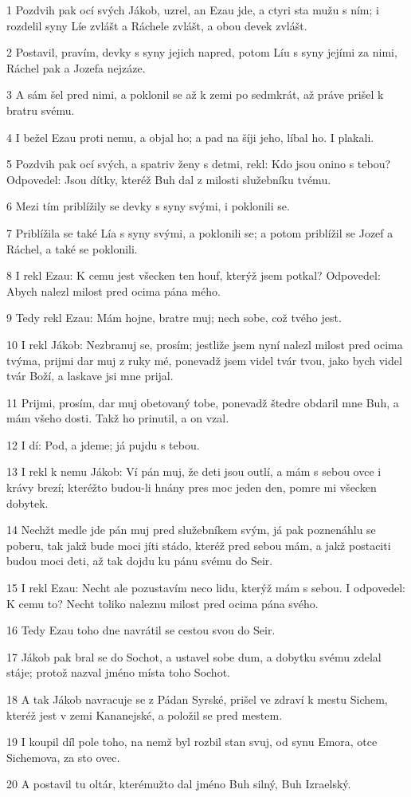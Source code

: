 \par 1 Pozdvih pak ocí svých Jákob, uzrel, an Ezau jde, a ctyri sta mužu s ním; i rozdelil syny Líe zvlášt a Ráchele zvlášt, a obou devek zvlášt.
\par 2 Postavil, pravím, devky s syny jejich napred, potom Líu s syny jejími za nimi, Ráchel pak a Jozefa nejzáze.
\par 3 A sám šel pred nimi, a poklonil se až k zemi po sedmkrát, až práve prišel k bratru svému.
\par 4 I bežel Ezau proti nemu, a objal ho; a pad na šíji jeho, líbal ho. I plakali.
\par 5 Pozdvih pak ocí svých, a spatriv ženy s detmi, rekl: Kdo jsou onino s tebou? Odpovedel: Jsou dítky, kteréž Buh dal z milosti služebníku tvému.
\par 6 Mezi tím priblížily se devky s syny svými, i poklonili se.
\par 7 Priblížila se také Lía s syny svými, a poklonili se; a potom priblížil se Jozef a Ráchel, a také se poklonili.
\par 8 I rekl Ezau: K cemu jest všecken ten houf, kterýž jsem potkal? Odpovedel: Abych nalezl milost pred ocima pána mého.
\par 9 Tedy rekl Ezau: Mám hojne, bratre muj; nech sobe, což tvého jest.
\par 10 I rekl Jákob: Nezbranuj se, prosím; jestliže jsem nyní nalezl milost pred ocima tvýma, prijmi dar muj z ruky mé, ponevadž jsem videl tvár tvou, jako bych videl tvár Boží, a laskave jsi mne prijal.
\par 11 Prijmi, prosím, dar muj obetovaný tobe, ponevadž štedre obdaril mne Buh, a mám všeho dosti. Takž ho prinutil, a on vzal.
\par 12 I dí: Pod, a jdeme; já pujdu s tebou.
\par 13 I rekl k nemu Jákob: Ví pán muj, že deti jsou outlí, a mám s sebou ovce i krávy brezí; kteréžto budou-li hnány pres moc jeden den, pomre mi všecken dobytek.
\par 14 Nechžt medle jde pán muj pred služebníkem svým, já pak poznenáhlu se poberu, tak jakž bude moci jíti stádo, kteréž pred sebou mám, a jakž postaciti budou moci deti, až tak dojdu ku pánu svému do Seir.
\par 15 I rekl Ezau: Necht ale pozustavím neco lidu, kterýž mám s sebou. I odpovedel: K cemu to? Necht toliko naleznu milost pred ocima pána svého.
\par 16 Tedy Ezau toho dne navrátil se cestou svou do Seir.
\par 17 Jákob pak bral se do Sochot, a ustavel sobe dum, a dobytku svému zdelal stáje; protož nazval jméno místa toho Sochot.
\par 18 A tak Jákob navracuje se z Pádan Syrské, prišel ve zdraví k mestu Sichem, kteréž jest v zemi Kananejské, a položil se pred mestem.
\par 19 I koupil díl pole toho, na nemž byl rozbil stan svuj, od synu Emora, otce Sichemova, za sto ovec.
\par 20 A postavil tu oltár, kterémužto dal jméno Buh silný, Buh Izraelský.

